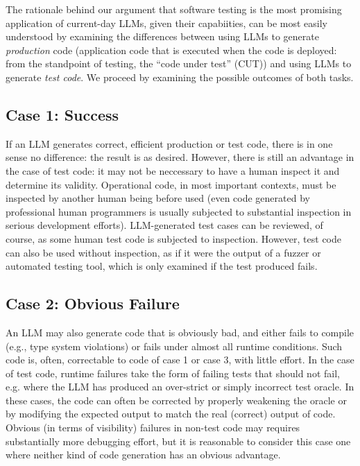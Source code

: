 \documentclass[sigconf,natbib=false]{acmart}
\begin{document}
The rationale behind our argument that software testing is the most
promising application of current-day LLMs, given their capabiities,
can be most easily understood by examining the differences between
using LLMs to generate \emph{production} code (application code that is
executed when the code is deployed:  from the standpoint of testing,
the ``code under test'' (CUT)) and using LLMs to
generate \emph{test code}.  We proceed by examining the possible outcomes of
both tasks.

\subsection{Case 1: Success}

If an LLM generates correct, efficient production or test code, there is in one sense no
difference: the result is as desired.  However, there is still an
advantage in the case of test code:  it may not be neccessary to have
a human inspect it and determine its validity.  Operational code, in
most important contexts, must be inspected by another human being
before used (even code generated by professional human programmers is
usually subjected to substantial inspection in serious development
efforts).  LLM-generated test cases can be reviewed, of course, as
some human test code is subjected to inspection.  However, test code
can also be used without inspection, as if it were the output of a
fuzzer or automated testing tool, which is only examined if the test
produced fails.

\subsection{Case 2: Obvious Failure}

An LLM may also generate code that is obviously bad, and either fails
to compile (e.g., type system violations) or fails under almost all
runtime conditions.  Such code is, often, correctable to code of case
1 or case 3, with little effort.  In the case of test code, runtime
failures take the form of failing tests that should not fail,
e.g. where the LLM has produced an over-strict or simply incorrect
test oracle.  In these cases, the code can often be corrected by
properly weakening the oracle or by modifying the expected output to
match the real (correct) output of code.  Obvious (in terms of
visibility) failures in non-test code may requires substantially more
debugging effort, but it is reasonable to consider this case one where
neither kind of code generation has an obvious advantage.
\end{document}
